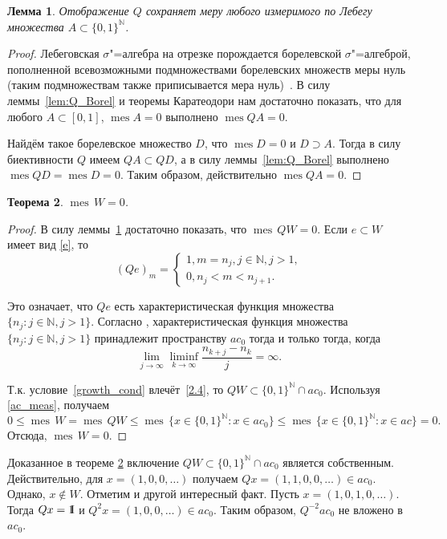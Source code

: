 \documentclass[12pt]{article}
\newcommand{\emm}{\mathrm{1\hspace{-0.3em} I}}
\newtheorem{thm}{Теорема}
\newtheorem{lem}[thm]{Лемма}
\def\N{{\mathbb{N}}}
\DeclareMathOperator{\mes}{mes}
\begin{document}
\begin{lem}\label{lem:Q_Lebesgue}
	Отображение $Q$ сохраняет меру любого измеримого по Лебегу множества $A\subset \{0,1\}^\N$.
\end{lem}

\begin{proof}
	Лебеговская $\sigma$"=алгебра на отрезке порождается борелевской $\sigma$"=алгеброй,
	пополненной всевозможными подмножествами борелевских множеств меры нуль
	(таким подмножествам также приписывается мера нуль)~\cite[пример 1.71]{klenke2013probability}.
	В силу леммы~\ref{lem:Q_Borel} и теоремы Каратеодори нам достаточно показать,
	что для любого $A\subset[0,1]$, $\mes A = 0$ выполнено $\mes QA = 0$.

	Найдём такое борелевское множество $D$, что $\mes D = 0$ и $D\supset A$.
	Тогда в силу биективности $Q$ имеем $QA \subset QD$, а в силу леммы~\ref{lem:Q_Borel} выполнено $\mes QD = \mes D = 0$.
	Таким образом, действительно $\mes QA = 0$.
\end{proof}


\begin{thm}\label{thm9}
$\mes \, W=0$.
\end{thm}

\begin{proof}
В силу леммы~\ref{lem:Q_Lebesgue} достаточно показать, что $\mes \, QW=0$. Если $e\subset W$ имеет вид \eqref{e}, то
$$(Qe)_m=\begin{cases}
1, m=n_j, j\in\N, j>1,\\
0, n_j<m<n_{j+1}.
\end{cases}$$

Это означает, что $Qe$ есть характеристическая функция множества $\{n_j: j\in \N, j>1\}$. Согласно \cite[Лемма 1]{Avdeev2019}, характеристическая функция множества $\{n_j: j\in \N, j>1\}$ принадлежит пространству $ac_0$ тогда и только тогда, когда
\begin{equation}\label{2.4}
    \lim\limits_{j\to\infty}\liminf_{k\to\infty}\frac{n_{k+j}-n_k}j=\infty.
\end{equation}

Т.к. условие~\eqref{growth_cond} влечёт~\eqref{2.4}, то $QW \subset \{0,1\}^\N \cap ac_0$. Используя \eqref{ac_meas}, получаем
$$0\leqslant \mes \, W= \mes \, QW\leqslant \mes \, \{x\in \{0,1\}^\N: x\in ac_0\}\leqslant \mes \, \{x\in \{0,1\}^\N: x\in ac\}=0.$$
Отсюда, $\mes \, W=0$.
\end{proof}

Доказанное в теореме \ref{thm9} включение $QW \subset \{0,1\}^\N \cap ac_0$ является собственным. Действительно, для $x=(1, 0, 0, \dots)$ получаем $Qx=(1,1, 0, 0, \dots)\in ac_0$. Однако, $x\notin W$. Отметим и другой интересный факт. Пусть $x=(1,0,1,0,\dots)$. Тогда $Qx=\emm$ и $Q^2x=(1,0,0, \dots)\in ac_0$. Таким образом, $Q^{-2}ac_0$ не вложено в $ac_0$.
\end{document}
